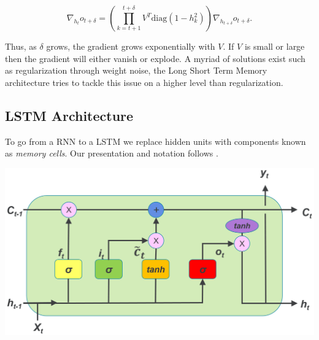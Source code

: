 \begin{equation*}
  \nabla_{h_t} o_{t + \delta} = \left( \prod_{k = t+1}^{t+\delta} V^T
  \text{diag}(1 - h^2_k) \right)\nabla_{h_{t + \delta}}o_{t + \delta}.
\end{equation*}

Thus, as $\delta$ grows, the gradient grows exponentially with $V$. If $V$ is
small or large then the gradient will either vanish or explode. A myriad
of solutions exist such as regularization through weight noise, the Long Short
Term Memory architecture tries to tackle this issue on a higher level than
regularization.
\subsection{LSTM Architecture}
To go from a RNN to a LSTM we replace hidden units with components known as
\textit{memory cells}. Our presentation and notation follows \cite{revieww}.
\begin{center}
    \includegraphics[width =\columnwidth]{lstm.png}
\end{center}

